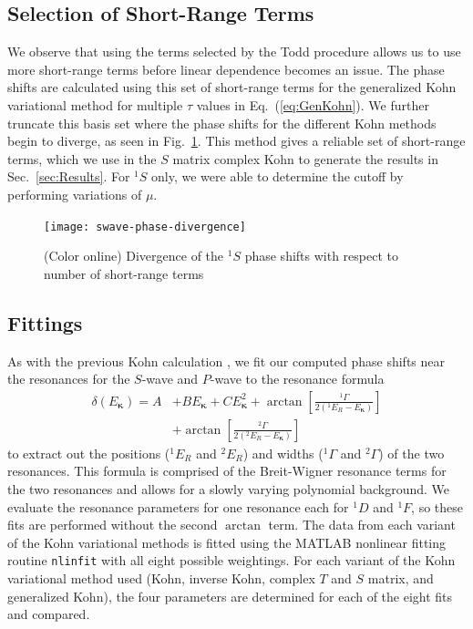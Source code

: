 \documentclass[preprint,showpacs,showkeys,preprintnumbers,amsmath,amssymb,longbibliography,pra,aps]{revtex4-1}
\begin{document}
\subsection{Selection of Short-Range Terms}
\label{sec:Truncation}
We observe that using the terms selected by the Todd procedure allows us to
use more short-range terms before linear dependence becomes an issue.
The phase shifts are calculated using this set of short-range terms for the 
generalized Kohn variational method for multiple $\tau$ values in
Eq.~(\ref{eq:GenKohn}). We further truncate this basis set where the phase
shifts for the different Kohn methods begin to diverge, as seen in
Fig.~\ref{fig:swave-phase-divergence}. This method gives a reliable set of
short-range terms, which we use in the $S$ matrix complex Kohn to generate
the results in Sec.~\ref{sec:Results}. For $^1S$ only, we were able to determine
the cutoff by performing variations of $\mu$.
\begin{figure}[H]
	\centering
	\texttt{[image: swave-phase-divergence]}
	\caption{(Color online) Divergence of the $^1S$ phase shifts with respect
to number of short-range terms}
	\label{fig:swave-phase-divergence}
\end{figure}

\subsection{Fittings}
As with the previous Kohn calculation \cite{VanReeth2004},
we fit our computed phase shifts near the resonances for
the $S$-wave and $P$-wave to the resonance formula
\begin{align}
\label{eq:ResonanceFit}
\delta(E_{\bm \kappa}) = A &+ B E_{\bm \kappa} + C E_{\bm \kappa}^2 + \arctan
  \left[ \frac{^1\Gamma}{2(^1E_R - E_{\bm \kappa})} \right]  \nonumber \\
& + \arctan \left[ \frac{^2\Gamma}{2(^2E_R - E_{\bm \kappa})} \right]
\end{align}
to extract out the positions ($^1E_R$ and $^2E_R$) and widths ($^1\Gamma$ and 
$^2\Gamma$) of the two resonances. This formula is comprised of the
Breit-Wigner resonance terms \cite{Breit1936,Macek1970} for the two resonances
and allows for a slowly varying polynomial background.
We evaluate the resonance parameters for one resonance each for $^1D$ and $^1F$,
so these fits are performed without the second $\arctan$ term.
The data from each variant of the Kohn variational 
methods is fitted using the MATLAB \cite{MATLAB} nonlinear fitting routine 
\texttt{nlinfit} with all eight possible weightings. For each variant of the 
Kohn variational method used (Kohn, inverse Kohn, complex $T$ and $S$ matrix,
and generalized Kohn), the four parameters are determined for each of the 
eight fits and compared.
\end{document}
